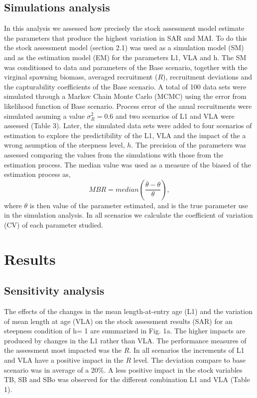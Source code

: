 \documentclass[11pt,letter,]{article}
\begin{document}
\subsection{Simulations analysis}\label{simulations-analysis}

In this analysis we assessed how precisely the stock assessment model
estimate the parameters that produce the highest variation in SAR and
MAI. To do this the stock assessment model (section 2.1) was used as a
simulation model (SM) and as the estimation model (EM) for the
parameters L1, VLA and h. The SM was conditioned to data and parameters
of the Base scenario, together with the virginal spawning biomass,
averaged recruitment (\(R\)), recruitment deviations and the
capturability coefficients of the Base scenario. A total of 100 data
sets were simulated through a Markov Chain Monte Carlo (MCMC) using the
error from likelihood function of Base scenario. Process error of the
anual recruitments were simulated asuming a value \(\sigma^2_R=0.6\) and
two scenarios of L1 and VLA were assessed (Table 3). Later, the
simulated data sets were added to four scenarios of estimation to
explore the predictibility of the L1, VLA and the impact of the a wrong
asumption of the steepness level, \(h\). The precision of the parameters
was assessed comparing the values from the simulations with those from
the estimation process. The median value was used as a measure of the
biased of the estimation process as, \[ 
MBR=median\left(\frac{\overline{\theta} - \theta}{\theta}\right), 
\] where \(\theta\) is then value of the parameter estimated, and is the
true parameter use in the simulation analysis. In all scenarios we
calculate the coefficient of variation (CV) of each parameter studied.

\section{Results}\label{results}

\subsection{Sensitivity analysis}\label{sensitivity-analysis-1}

The effects of the changes in the mean length-at-entry age (L1) and the
variation of mean length at age (VLA) on the stock assessment results
(SAR) for an steepness condition of h= 1 are summarized in Fig. 1a. The
higher impacts are produced by changes in the L1 rather than VLA. The
performance measures of the assessment most impacted was the \(R\). In
all scenarios the increments of L1 and VLA have a positive impact in the
\(R\) level. The deviation compare to base scenario was in average of a
20\%. A less positive impact in the stock variables TB, SB and SBo was
observed for the different combination L1 and VLA (Table 1).
\end{document}
